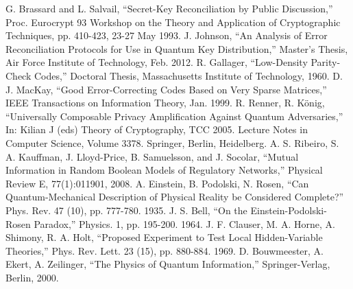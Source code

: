 \documentclass[conference]{IEEEtran}
\begin{document}
\begin{thebibliography}{26}
  G. Brassard and L. Salvail, ``Secret-Key Reconciliation by Public Discussion,'' Proc. Eurocrypt 93 Workshop on the Theory and Application of Cryptographic Techniques, pp. 410-423, 23-27 May 1993.
  J. Johnson, ``An Analysis of Error Reconciliation Protocols for Use in Quantum Key Distribution,'' Master's Thesis, Air Force Institute of Technology, Feb. 2012.
  R. Gallager, ``Low-Density Parity-Check Codes,'' Doctoral Thesis, Massachusetts Institute of Technology, 1960.
  D. J. MacKay, ``Good Error-Correcting Codes Based on Very Sparse Matrices,'' IEEE Transactions on Information Theory, Jan. 1999.
  R. Renner, R. K\"onig, ``Universally Composable Privacy Amplification Against Quantum Adversaries,'' In: Kilian J (eds) Theory of Cryptography, TCC 2005. Lecture Notes in Computer Science, Volume 3378. Springer, Berlin, Heidelberg.
  A. S. Ribeiro, S. A. Kauffman, J. Lloyd-Price, B. Samuelsson, and J. Socolar, ``Mutual Information in Random Boolean Models of Regulatory Networks,'' Physical Review E, 77(1):011901, 2008.
  A. Einstein, B. Podolski, N. Rosen, ``Can Quantum-Mechanical Description of Physical Reality be Considered Complete?'' Phys. Rev. 47 (10), pp. 777-780. 1935.
  J. S. Bell, ``On the Einstein-Podolski-Rosen Paradox,'' Physics. 1, pp. 195-200. 1964.
  J. F. Clauser, M. A. Horne, A. Shimony, R. A. Holt, ``Proposed Experiment to Test Local Hidden-Variable Theories,'' Phys. Rev. Lett. 23 (15), pp. 880-884. 1969.
  D. Bouwmeester, A. Ekert, A. Zeilinger, ``The Physics of Quantum Information,'' Springer-Verlag, Berlin, 2000.
\end{thebibliography}

\appendix
\end{document}

